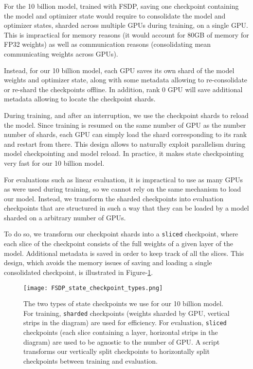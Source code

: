 \documentclass[10pt,twocolumn,letterpaper]{article}
\begin{document}
For the 10 billion model, trained with FSDP, saving one checkpoint containing the model and optimizer state would require to consolidate the model and optimizer states, sharded across multiple GPUs during training, on a single GPU. This is impractical for memory reasons (it would account for 80GB of memory for FP32 weights) as well as communication reasons (consolidating mean communicating weights across GPUs).

Instead, for our 10 billion model, each GPU saves its own shard of the model weights and optimizer state, along with some metadata allowing to re-consolidate or re-shard the checkpoints offline. In addition, rank 0 GPU will save additional metadata allowing to locate the checkpoint shards.

During training, and after an interruption, we use the checkpoint shards to reload the model. Since training is resumed on the same number of GPU as the number number of shards, each GPU can simply load the shard corresponding to its rank and restart from there. This design allows to naturally exploit parallelism during model checkpointing and model reload. In practice, it makes state checkpointing very fast for our 10 billion model.

For evaluations such as linear evaluation, it is impractical to use as many GPUs as were used during training, so we cannot rely on the same mechanism to load our model. Instead, we transform the sharded checkpoints into evaluation checkpoints that are structured in such a way that they can be loaded by a model sharded on a arbitrary number of GPUs.

 To do so, we transform our checkpoint shards into a \texttt{sliced} checkpoint, where each slice of the checkpoint consists of the full weights of a given layer of the model. Additional metadata is saved in order to keep track of all the slices. This design, which avoids the memory issues of saving and loading a single consolidated checkpoint, is illustrated in Figure-\ref{fig:fsdp_state_resharding}.

\begin{figure}[t]
    \centering
    \texttt{[image: FSDP\_state\_checkpoint\_types.png]}
    \caption{
      The two types of state checkpoints we use for our 10 billion model. For training, \texttt{sharded} checkpoints (weights sharded by GPU, vertical strips in the diagram) are used for efficiency. For evaluation, \texttt{sliced} checkpoints (each slice containing a layer, horizontal strips in the diagram) are used to be agnostic to the number of GPU. A script transforms our vertically split checkpoints to horizontally split checkpoints between training and evaluation.
    }
    \label{fig:fsdp_state_resharding} 
\end{figure}
\end{document}
